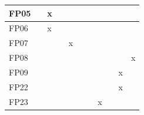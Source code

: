 \begin{table}
\begin{tabular}{l|l|l|l|l|l|l|l|l|l|l}
        \hline
        FP05 &                                & x                              &                                &                                &                                &                                &                                &                                &                                &                                \\
        \hline
        FP06 &                                & x                              &                                &                                &                                &                                &                                &                                &                                &                                \\
        \hline
        FP07 &                                &                                &                                & x                              &                                &                                &                                &                                &                                &                                \\
        \hline
        FP08 &                                &                                &                                &                                &                                &                                &                                &                                &                                & x                              \\
        \hline
        FP09 &                                &                                &                                &                                &                                &                                &                                &                                & x                              &                                \\
        \hline
        FP22 &                                &                                &                                &                                &                                &                                &                                &                                & x                              &                                \\
        \hline
        FP23 &                                &                                &                                &                                &                                &                                & x                              &                                &                                &                                \\

\end{tabular}
\end{table}
